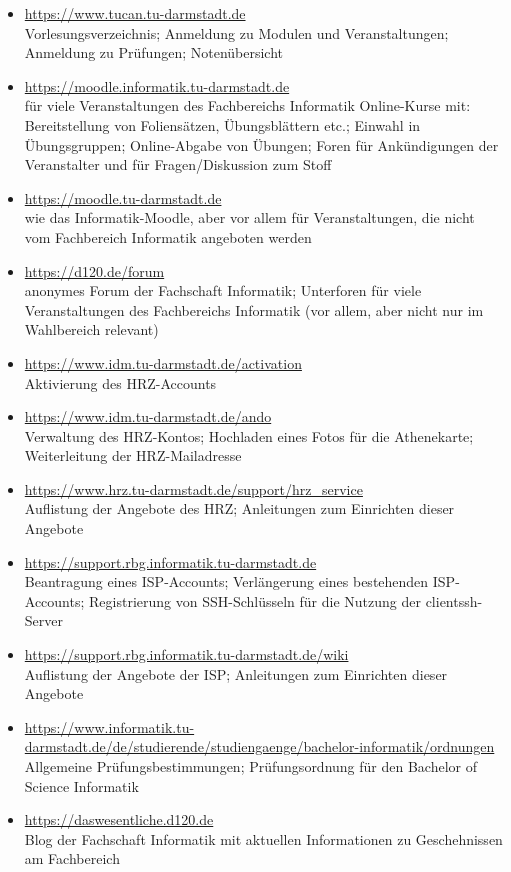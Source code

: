 
\vspace{5mm}

\begin{itemize}
    \item \url{https://www.tucan.tu-darmstadt.de}\\
        Vorlesungsverzeichnis; Anmeldung zu Modulen und Veranstaltungen; Anmeldung zu Prüfungen; Notenübersicht
    \item \url{https://moodle.informatik.tu-darmstadt.de}\\
        für viele Veranstaltungen des Fachbereichs Informatik Online-Kurse mit: Bereitstellung von Foliensätzen, Übungsblättern etc.; Einwahl in Übungsgruppen; Online-Abgabe von Übungen; Foren für Ankündigungen der Veranstalter und für Fragen/Diskussion zum Stoff
    \item \url{https://moodle.tu-darmstadt.de}\\
        wie das Informatik-Moodle, aber vor allem für Veranstaltungen, die nicht vom Fachbereich Informatik angeboten werden
    \item \url{https://d120.de/forum}\\
        anonymes Forum der Fachschaft Informatik; Unterforen für viele Veranstaltungen des Fachbereichs Informatik (vor allem, aber nicht nur im Wahlbereich relevant)
    \item \url{https://www.idm.tu-darmstadt.de/activation}\\
        Aktivierung des HRZ-Accounts
    \item \url{https://www.idm.tu-darmstadt.de/ando}\\
        Verwaltung des HRZ-Kontos; Hochladen eines Fotos für die Athenekarte; Weiterleitung der HRZ-Mailadresse
    \item \url{https://www.hrz.tu-darmstadt.de/support/hrz_service}\\
        Auflistung der Angebote des HRZ; Anleitungen zum Einrichten dieser Angebote
    \item \url{https://support.rbg.informatik.tu-darmstadt.de}\\
        Beantragung eines ISP-Accounts; Verlängerung eines bestehenden ISP-Accounts; Registrierung von SSH-Schlüsseln für die Nutzung der clientssh-Server
    \item \url{https://support.rbg.informatik.tu-darmstadt.de/wiki}\\
        Auflistung der Angebote der ISP; Anleitungen zum Einrichten dieser Angebote
    \item \url{https://www.informatik.tu-darmstadt.de/de/studierende/studiengaenge/bachelor-informatik/ordnungen}\\
        Allgemeine Prüfungsbestimmungen; Prüfungsordnung für den Bachelor of Science Informatik
    \item \url{https://daswesentliche.d120.de}\\
        Blog der Fachschaft Informatik mit aktuellen Informationen zu Geschehnissen am Fachbereich
\end{itemize}

\newpage
